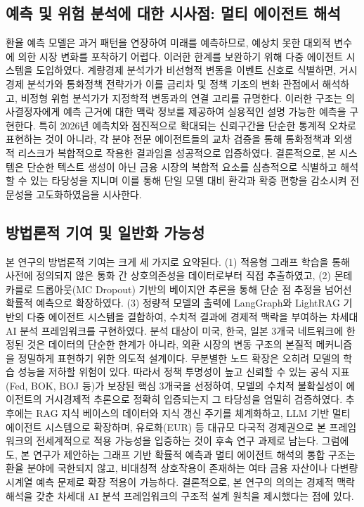 \subsection{예측 및 위험 분석에 대한 시사점: 멀티 에이전트 해석}
환율 예측 모델은 과거 패턴을 연장하여 미래를 예측하므로, 예상치 못한 대외적 변수에 의한 시장 변화를 포착하기 어렵다. 이러한 한계를 보완하기 위해 다중 에이전트 시스템을 도입하였다. 계량경제 분석가가 비선형적 변동을 이벤트 신호로 식별하면, 거시경제 분석가와 통화정책 전략가가 이를 금리차 및 정책 기조의 변화 관점에서 해석하고, 비정형 위험 분석가가 지정학적 변동과의 연결 고리를 규명한다. 이러한 구조는 의사결정자에게 예측 근거에 대한 맥락 정보를 제공하여 실용적인 설명 가능한 예측을 구현한다. 특히 2026년 예측치와 점진적으로 확대되는 신뢰구간을 단순한 통계적 오차로 표현하는 것이 아니라, 각 분야 전문 에이전트들의 교차 검증을 통해 통화정책과 외생적 리스크가 복합적으로 작용한 결과임을 성공적으로 입증하였다. 결론적으로, 본 시스템은 단순한 텍스트 생성이 아닌 금융 시장의 복합적 요소를 심층적으로 식별하고 해석할 수 있는 타당성을 지니며 이를 통해 단일 모델 대비 환각과 확증 편향을 감소시켜 전문성을 고도화하였음을 시사한다\cite{FinVision2024}.

\subsection{방법론적 기여 및 일반화 가능성}
본 연구의 방법론적 기여는 크게 세 가지로 요약된다. (1) 적응형 그래프 학습을 통해 사전에 정의되지 않은 통화 간 상호의존성을 데이터로부터 직접 추출하였고, (2) 몬테카를로 드롭아웃(MC Dropout) 기반의 베이지안 추론을 통해 단순 점 추정을 넘어선 확률적 예측으로 확장하였다. (3) 정량적 모델의 출력에 LangGraph와 LightRAG 기반의 다중 에이전트 시스템을 결합하여, 수치적 결과에 경제적 맥락을 부여하는 차세대 AI 분석 프레임워크를 구현하였다.
분석 대상이 미국, 한국, 일본 3개국 네트워크에 한정된 것은 데이터의 단순한 한계가 아니라, 외환 시장의 변동 구조의 본질적 메커니즘을 정밀하게 표현하기 위한 의도적 설계이다. 무분별한 노드 확장은 오히려 모델의 학습 성능을 저하할 위험이 있다. 따라서 정책 투명성이 높고 신뢰할 수 있는 공식 지표(Fed, BOK, BOJ 등)가 보장된 핵심 3개국을 선정하여, 모델의 수치적 불확실성이 에이전트의 거시경제적 추론으로 정확히 입증되는지 그 타당성을 엄밀히 검증하였다. 추후에는 RAG 지식 베이스의 데이터와 지식 갱신 주기를 체계화하고, LLM 기반 멀티 에이전트 시스템으로 확장하며, 유로화(EUR) 등 대규모 다국적 경제권으로 본 프레임워크의 전세계적으로 적용 가능성을 입증하는 것이 후속 연구 과제로 남는다.
그럼에도, 본 연구가 제안하는 그래프 기반 확률적 예측과 멀티 에이전트 해석의 통합 구조는 환율 분야에 국한되지 않고, 비대칭적 상호작용이 존재하는 여타 금융 자산이나 다변량 시계열 예측 문제로 확장 적용이 가능하다. 결론적으로, 본 연구의 의의는 경제적 맥락 해석을 갖춘 차세대 AI 분석 프레임워크의 구조적 설계 원칙을 제시했다는 점에 있다.
